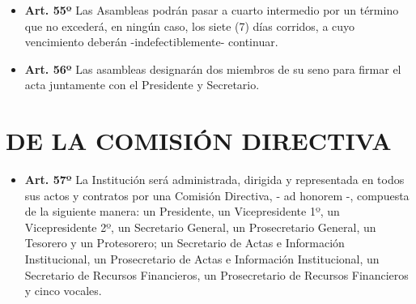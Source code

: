 \documentclass[openany]{book}
\providecommand{\tightlist}{%
  \setlength{\itemsep}{0pt}\setlength{\parskip}{0pt}}
\begin{document}
\begin{itemize}
\tightlist
\item
  \textbf{Art. 55º}
  Las Asambleas podrán pasar a cuarto intermedio por un término que no excederá, en ningún caso, los siete (7) días corridos, a cuyo vencimiento deberán -indefectiblemente- continuar.
\end{itemize}

\begin{itemize}
\tightlist
\item
  \textbf{Art. 56º}
  Las asambleas designarán dos miembros de su seno para firmar el acta juntamente con el Presidente y Secretario.
\end{itemize}

\hypertarget{cap7}{%
\chapter{DE LA COMISIÓN DIRECTIVA}\label{cap7}}

\begin{itemize}
\tightlist
\item
  \textbf{Art. 57º}
  La Institución será administrada, dirigida y representada en todos sus actos y contratos por una Comisión Directiva, - ad honorem -, compuesta de la siguiente manera: un Presidente, un Vicepresidente 1º, un Vicepresidente 2º, un Secretario General, un Prosecretario General, un Tesorero y un Protesorero; un Secretario de Actas e Información Institucional, un Prosecretario de Actas e Información Institucional, un Secretario de Recursos Financieros, un Prosecretario de Recursos Financieros y cinco vocales.
\end{itemize}
\end{document}
